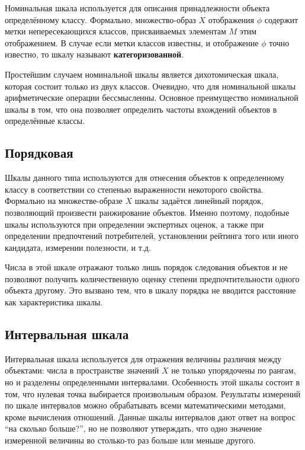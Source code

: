 \documentclass[a4paper,12pt]{extreport}
\begin{document}
Номинальная шкала используется для описания принадлежности объекта определённому
классу. Формально, множество-образ $X$ отображения $\phi$ содержит метки непересекающихся
классов, присваиваемых элементам $M$ этим отображением. В случае если метки классов
известны, и отображение $\phi$ точно известно, то шкалу называют \textbf{категоризованной}.

Простейшим случаем номинальной шкалы является дихотомическая шкала, которая состоит
только из двух классов. Очевидно, что для номинальной шкалы арифметические операции
бессмысленны. Основное преимущество номинальной шкалы в том, что она позволяет
определить частоты вхождений объектов в определённые классы.

\subsection*{Порядковая} %
\label{sub:ordered}

Шкалы данного типа используются для отнесения объектов к определенному классу
в соответствии со степенью выраженности некоторого свойства. Формально на
множестве-образе $X$ шкалы задаётся линейный порядок, позволяющий произвести
ранжирование объектов. Именно поэтому, подобные шкалы используются при определении
экспертных оценок, а также при определении предпочтений потребителей, установлении
рейтинга того или иного кандидата, измерении полезности, и т.д.

Числа в этой шкале отражают только лишь порядок следования объектов и не позволяют
получить количественную оценку степени предпочтительности одного объекта другому.
Это вызвано тем, что в шкалу порядка не вводится расстояние как характеристика шкалы.


\subsection*{Интервальная шкала} %
\label{sub:interval_scale}

Интервальная шкала используется для отражения величины различия между объектами:
числа в пространстве значений $X$ не только упорядочены по рангам, но и разделены
определенными интервалами. Особенность этой шкалы состоит в том, что нулевая точка
выбирается произвольным образом. Результаты измерений по шкале интервалов можно
обрабатывать всеми математическими методами, кроме вычисления отношений. Данные
шкалы интервалов дают ответ на вопрос ``на сколько больше?'', но не позволяют
утверждать, что одно значение измеренной величины во столько-то раз больше или
меньше другого.
\end{document}
